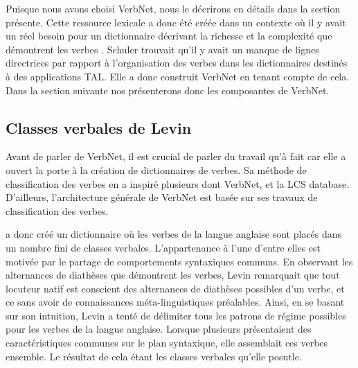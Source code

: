Puisque nous avons choisi VerbNet, nous le décrirons en détails dans la section présente. Cette ressource lexicale a donc été créée dans un contexte où il y avait un réel besoin pour un dictionnaire décrivant la richesse et la complexité que démontrent les verbes \citep{KipperClassBasedConstructionVerb2000}. Schuler trouvait qu'il y avait un manque de lignes directrices par rapport à l'organisation des verbes dans les dictionnaires destinés à des applications \ac{TAL}. Elle a donc construit VerbNet en tenant compte de cela. Dans la section suivante nos présenterons donc les composantes de VerbNet. 

\subsection{Classes verbales de Levin}

Avant de parler de VerbNet, il est crucial de parler du travail qu'à fait \cite{verb-classes.levin.1993} car elle a ouvert la porte à la création de dictionnaires de verbes. Sa méthode de classification des verbes en a inspiré plusieurs dont VerbNet\cite{SchulerVerbnetBroadcoverageComprehensive2005}, et la LCS database\citep{AyanGeneratingParsingLexicon2002a}\citep{DorrUseLexicalSemantics1992}. D'ailleurs, l'architecture générale de VerbNet est basée sur ses travaux de classification des verbes.

\cite{verb-classes.levin.1993} a donc créé un dictionnaire où les verbes de la langue anglaise sont placés dans un nombre fini de classes verbales. L'appartenance à l'une d'entre elles est motivée par le partage de comportements syntaxiques communs. En observant les alternances de diathèses que démontrent les verbes, Levin remarquait que tout locuteur natif est conscient des alternances de diathèses possibles d'un verbe, et ce sans avoir de connaissances méta-linguistiques préalables. Ainsi, en se basant sur son intuition, Levin a tenté de délimiter tous les patrons de régime possibles pour les verbes de la langue anglaise. Lorsque plusieurs présentaient des caractéristiques communes sur le plan syntaxique, elle assemblait ces verbes ensemble. Le résultat de cela étant les classes verbales qu'elle posutle.

